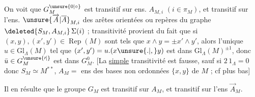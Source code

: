  On voit que $G_M^{\unsure{0|\circ}}$ est transitif sur   ens. $A_{M,i}$ $(i\in\pi_M)$, et   transitif sur l'ens. $\unsure{\overrightarrow A|\overline A}_{M,i}$ des arêtes orientées ou repères du graphe $\deleted{S_M,A_{M,i}}\,\Sigma(i)$ ;
 transitivité provient du fait que si $(x,y),(x',y')\in\operatorname{Rep}(M)$ sont tels que $x\wedge y=\pm x'\wedge y'$, alors l'unique $u\in\mathrm{Gl}_{\Lambda}(M)$ tel que $(x',y')=u.(x\unsure{.|,}y)$ est dans $\mathrm{Gl}_{\Lambda}(M)^{\pm1}$, donc $\bar u\in G_M^{\unsure{\prime|{}}}$ est dans $G_M^0$.
[La \uline{simple} transitivité est fausse, sauf si $2\,1_{\Lambda}=0$ donc $S_M\simeq M^{**}$, $A_M=$ ens des bases non ordonnées $\{x,y\}$ de $M$ ; cf plus bas]

Il en résulte que le groupe $G_M$ est transitif sur $A_M$, et   transitif sur l'ens $\overrightarrow A_M$.

